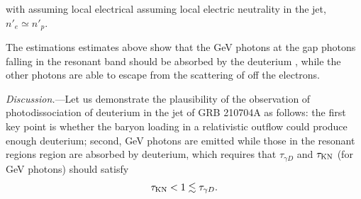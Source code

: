 \documentclass[prd,twocolumn,amsmath,amssymb,aps,linenumbers]{revtex4-2} %
\providecommand{\DIFaddtex}[1]{{\protect\color{blue} \sf #1}} %
\providecommand{\DIFdeltex}[1]{{\protect\color{red} \scriptsize #1}} %
\providecommand{\DIFaddbegin}{} %
\providecommand{\DIFaddend}{} %
\providecommand{\DIFdelbegin}{} %
\providecommand{\DIFdelend}{} %
\providecommand{\DIFadd}[1]{\texorpdfstring{\DIFaddtex{#1}}{#1}} %
\providecommand{\DIFdel}[1]{\texorpdfstring{\DIFdeltex{#1}}{}} %
\newcommand{\DIFscaledelfig}{0.5}
\newlength{\DIFdelgraphicswidth} %
\newlength{\DIFdelgraphicsheight} %
\newcommand{\DIFaddincludegraphics}[2][]{{\color{blue}\fbox{\DIFOincludegraphics[#1]{#2}}}} %
\newcommand{\DIFdelincludegraphics}[2][]{%
\sbox{\DIFdelgraphicsbox}{\DIFOincludegraphics[#1]{#2}}%
\settoboxwidth{\DIFdelgraphicswidth}{\DIFdelgraphicsbox} %
\settoboxtotalheight{\DIFdelgraphicsheight}{\DIFdelgraphicsbox} %
\scalebox{\DIFscaledelfig}{%
\parbox[b]{\DIFdelgraphicswidth}{\usebox{\DIFdelgraphicsbox}\\[-\baselineskip] \rule{\DIFdelgraphicswidth}{0em}}\llap{\resizebox{\DIFdelgraphicswidth}{\DIFdelgraphicsheight}{%
\setlength{\unitlength}{\DIFdelgraphicswidth}%
\begin{picture}(1,1)%
\thicklines\linethickness{2pt} %
{\color[rgb]{1,0,0}\put(0,0){\framebox(1,1){}}}%
{\color[rgb]{1,0,0}\put(0,0){\line( 1,1){1}}}%
{\color[rgb]{1,0,0}\put(0,1){\line(1,-1){1}}}%
\end{picture}%
}\hspace*{3pt}}} %
} %
\DeclareRobustCommand{\DIFaddbegin}{\DIFOaddbegin \let\includegraphics\DIFaddincludegraphics} %
\DeclareRobustCommand{\DIFaddend}{\DIFOaddend \let\includegraphics\DIFOincludegraphics} %
\DeclareRobustCommand{\DIFdelbegin}{\DIFOdelbegin \let\includegraphics\DIFdelincludegraphics} %
\DeclareRobustCommand{\DIFdelend}{\DIFOaddend \let\includegraphics\DIFOincludegraphics} %
\begin{document}
\DIFdelbegin \DIFdel{with assuming local electrical }\DIFdelend \DIFaddbegin \DIFadd{assuming local electric }\DIFaddend neutrality in the jet, $n'_{e}\simeq n'_p$.

The \DIFdelbegin \DIFdel{estimations }\DIFdelend \DIFaddbegin \DIFadd{estimates }\DIFaddend above show that the \DIFdelbegin \DIFdel{GeV photons at the gap }\DIFdelend \DIFaddbegin \DIFadd{photons falling in the resonant band }\DIFaddend should be absorbed by the deuterium\DIFaddbegin \DIFadd{, }\DIFaddend while the other photons are able to escape from the scattering \DIFdelbegin \DIFdel{of }\DIFdelend \DIFaddbegin \DIFadd{off }\DIFaddend the electrons.%


\textit{Discussion.}---Let us demonstrate
the plausibility of the observation of photodissociation of deuterium in the jet of GRB 210704A as follows: the \DIFaddbegin \DIFadd{first }\DIFaddend key point is whether \DIFaddbegin \DIFadd{the }\DIFaddend baryon loading in a relativistic outflow could produce enough deuterium;
second, GeV photons are emitted while those in the resonant \DIFdelbegin \DIFdel{regions }\DIFdelend \DIFaddbegin \DIFadd{region }\DIFaddend are absorbed by deuterium, which requires that $\tau_{\gamma D}$ and $\tau_{\rm KN}$ (for GeV photons) \DIFdelbegin \DIFdel{should }\DIFdelend satisfy
\begin{equation}\label{eq:criterion}
    \tau_{\rm KN}<1\lesssim\tau_{\gamma D}.
\end{equation}
\end{document}
